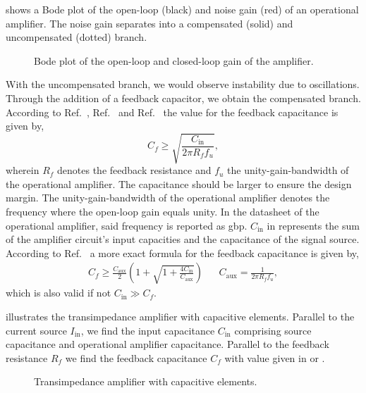  shows a Bode plot of the open-loop (black) and noise gain (red) of an operational amplifier.
The noise gain separates into a compensated (solid) and uncompensated (dotted) branch.
\begin{figure}[H]
	\centering
	
	\caption{Bode plot of the open-loop and closed-loop gain of the amplifier.}\label{fig:bode_gain}
\end{figure}
With the uncompensated branch, we would observe instability due to oscillations.
Through the addition of a feedback capacitor, we obtain the compensated branch.
According to Ref.~\cite[p.~113]{Jung05}, Ref.~\cite[p.~693]{Hobbs11} and Ref.~\cite[Ch.~3]{Graeme96} the value for the feedback capacitance is given by,
\begin{equation}
	C_f\geq\sqrt{\frac{C_\text{in}}{2\pi R_f f_u}}
	\label{eq:feedback_capacitance_approximation},
\end{equation}
wherein $R_f$ denotes the feedback resistance and $f_u$ the unity-gain-bandwidth of the operational amplifier.
The capacitance should be larger to ensure the design margin.
The unity-gain-bandwidth of the operational amplifier denotes the frequency where the open-loop gain equals unity. In the datasheet of the operational amplifier, said frequency is reported as \gls{gbp}.
$C_\text{in}$ in  represents the sum of the amplifier circuit's input capacities and the capacitance of the signal source.
According to Ref.~\cite[p.~185]{Carter17} a more exact formula for the feedback capacitance is given by,
\begin{align}
	C_f\geq\frac{C_\text{aux}}{2}\left(1+\sqrt{1+\frac{4C_\text{in}}{C_\text{aux}}}\right) &&
	C_\text{aux}=\frac{1}{2\pi R_f f_u}
	\label{eq:feedback_capacitance_exact},
\end{align}
which is also valid if not $C_\text{in}\gg C_f$.

 illustrates the transimpedance amplifier with capacitive elements.
Parallel to the current source $I_\text{in}$, we find the input capacitance $C_\text{in}$ comprising source capacitance and operational amplifier capacitance.
Parallel to the feedback resistance $R_f$ we find the feedback capacitance $C_f$ with value given in  or .
\begin{figure}[H]
	\centering
	
	\caption{Transimpedance amplifier with capacitive elements.}\label{fig:capacitive_transimpedance}
\end{figure}

